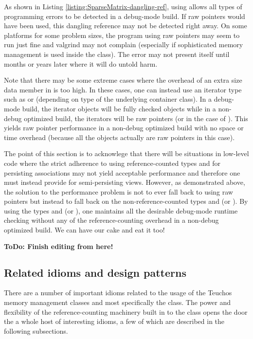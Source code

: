 \documentclass[pdf,ps2pdf,11pt]{SANDreport}
\begin{document}
As shown in Listing {}\ref{listing:SparseMatrix-dangling-ref}, using
{} allows all types of programming errors to be
detected in a debug-mode build.  If raw pointers would have been used,
this dangling reference may not be detected right away.  On some
platforms for some problem sizes, the program using raw pointers may
seem to run just fine and valgrind may not complain (especially if
sophisticated memory management is used inside the
{} class).  The error may not present itself
until months or years later where it will do untold harm.

Note that there may be some extreme cases where the overhead of an
extra size data member in {} is too high.  In these
cases, one can instead use an iterator type such as
{} or {} (depending on
type of the underlying container class).  In a debug-mode build, the
iterator objects will be fully checked {} objects while
in a non-debug optimized build, the iterators will be raw pointers (or
{} in the case of {}).
This yields raw pointer performance in a non-debug optimized build
with no space or time overhead (because all the objects actually are
raw pointers in this case).

The point of this section is to acknowlege that there will be
situations in low-level code where the strict adherence to using
reference-counted types {} and {} for
persisting associations may not yield acceptable performance and
therefore one must instead provide for semi-persisting views.
However, as demonstrated above, the solution to the performance
problem is not to ever fall back to using raw pointers but instead to
fall back on the non-reference-counted types {} and
{} (or {}).  By using the
types {} and {} (or
{}), one maintains all the desirable
debug-mode runtime checking without any of the reference-counting
overhead in a non-debug optimized build.  We can have our cake and eat
it too!

{}\textbf{ToDo: Finish editing from here!}


%
{}\subsection{Related idioms and design patterns}
%

There are a number of important idioms related to the usage of the
Teuchos memory management classes and most specifically the
{} class.  The power and flexibility of the
reference-counting machinery built in to the {} class
opens the door the a whole host of interesting idioms, a few of which
are described in the following subsections.
\end{document}
